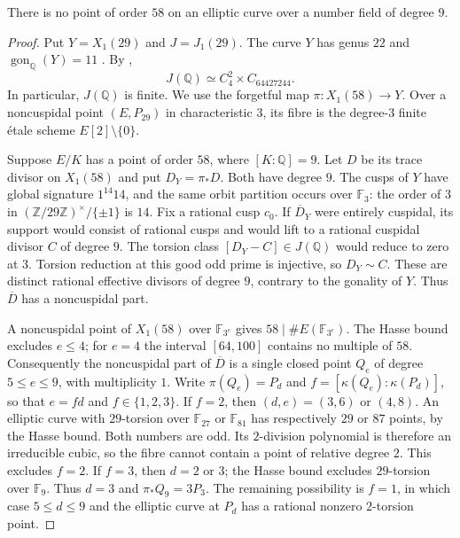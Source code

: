 \begin{proposition}\label{prop:nonic-no58}
There is no point of order $58$ on an elliptic curve over a number
field of degree $9$.
\end{proposition}
\begin{proof}
Put $Y=X_1(29)$ and $J=J_1(29)$. The curve $Y$ has genus $22$ and
$\operatorname{gon}_{\mathbb Q}(Y)=11$ \cite{DvH}. By
\cite[Theorem~3.1(2), Theorem~4.13 and Table~2]{DEHMZ},
\[
 J(\mathbb Q)\simeq C_4^2\times C_{64427244}.
\]
In particular, $J(\mathbb Q)$ is finite. We use the forgetful map
$\pi:X_1(58)\longrightarrow Y$. Over a noncuspidal point $(E,P_{29})$
in characteristic $3$, its fibre is the degree-$3$ finite \'etale
scheme $E[2]\setminus\{0\}$.

Suppose $E/K$ has a point of order $58$, where $[K:\mathbb Q]=9$.
Let $D$ be its trace divisor on $X_1(58)$ and put $D_Y=\pi_*D$.
Both have degree $9$. The cusps of $Y$ have global signature
$1^{14}14$, and the same orbit partition occurs over $\mathbb F_3$:
the order of $3$ in $(\mathbb Z/29\mathbb Z)^\times/\{\pm1\}$ is $14$.
Fix a rational cusp $c_0$. If $\overline D_Y$ were entirely cuspidal,
its support would consist of rational cusps and would lift to a
rational cuspidal divisor $C$ of degree $9$.
The torsion class $[D_Y-C]\in J(\mathbb Q)$ would reduce to zero
at $3$. Torsion reduction at this good odd prime is injective, so
$D_Y\sim C$. These are distinct rational effective divisors of
degree $9$, contrary to the gonality of $Y$.
Thus $\overline D$ has a noncuspidal part.

A noncuspidal point of $X_1(58)$ over $\mathbb F_{3^e}$ gives
$58\mid\#E(\mathbb F_{3^e})$. The Hasse bound excludes $e\le4$;
for $e=4$ the interval $[64,100]$ contains no multiple of $58$.
Consequently the noncuspidal part of $\overline D$ is a single
closed point $Q_e$ of degree $5\le e\le9$, with multiplicity $1$.
Write $\pi(Q_e)=P_d$ and $f=[\kappa(Q_e):\kappa(P_d)]$, so that
$e=fd$ and $f\in\{1,2,3\}$.
If $f=2$, then $(d,e)=(3,6)$ or $(4,8)$.
An elliptic curve with $29$-torsion over $\mathbb F_{27}$ or
$\mathbb F_{81}$ has respectively $29$ or $87$ points, by the
Hasse bound. Both numbers are odd. Its $2$-division polynomial
is therefore an irreducible cubic, so the fibre cannot contain
a point of relative degree $2$. This excludes $f=2$.
If $f=3$, then $d=2$ or $3$; the Hasse bound excludes
$29$-torsion over $\mathbb F_9$. Thus $d=3$ and
$\pi_*Q_9=3P_3$.
The remaining possibility is $f=1$, in which case $5\le d\le9$
and the elliptic curve at $P_d$ has a rational nonzero $2$-torsion
point.


\end{proof}
